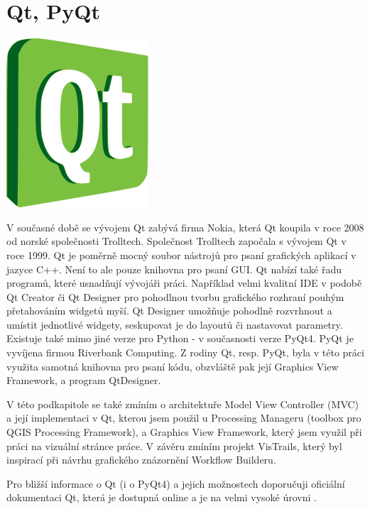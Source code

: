 \newpage
\section{Qt, PyQt}
\nocite{pyqt:www}

\begin{center}
	\includegraphics[scale=0.3]{pictures/qt_logo}
\end{center}

V současné době se vývojem Qt zabývá firma Nokia, která Qt koupila v roce 2008 od norské společnosti Trolltech. Společnost Trolltech započala s vývojem Qt v roce 1999. Qt je poměrně mocný soubor nástrojů pro psaní grafických aplikací v jazyce C++. Není to ale pouze knihovna pro psaní GUI. Qt nabízí také řadu programů, které usnadňují vývojáři práci. Například velmi kvalitní IDE v podobě Qt Creator či Qt Designer pro pohodlnou tvorbu grafického rozhraní pouhým přetahováním widgetů myší. Qt Designer umožňuje pohodlně rozvrhnout a umístit jednotlivé widgety, seskupovat je do layoutů či nastavovat parametry. \\
\indent Existuje také mimo jiné verze pro Python - v současnosti verze PyQt4. PyQt je vyvíjena firmou Riverbank Computing. Z rodiny Qt, resp. PyQt, byla v této práci využita samotná knihovna pro psaní kódu, obzvláště pak její Graphics View Framework, a program QtDesigner.

V této podkapitole se také zmíním o architektuře Model View Controller (MVC) a její implementaci v Qt, kterou jsem použil u Processing Manageru (toolbox pro QGIS Processing Framework), a Graphics View Framework, který jsem využil při práci na vizuální stránce práce. V závěru zmíním projekt VisTrails, který byl inspirací při návrhu grafického znázornění Workflow Builderu. 

Pro bližší informace o Qt (i o PyQt4) a jejich možnostech doporučuji oficiální dokumentaci Qt, která je dostupná online a je na velmi vysoké úrovni \cite{qt:www}.

